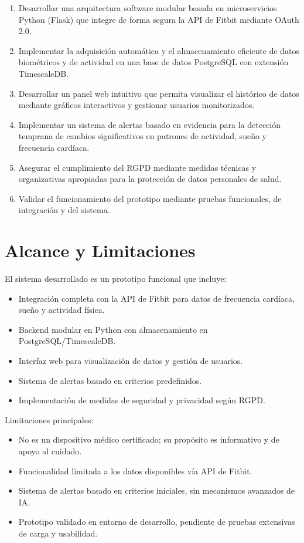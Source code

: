 \begin{enumerate}
    \item Desarrollar una arquitectura software modular basada en microservicios Python (Flask) que integre de forma segura la API de Fitbit\textsuperscript{\textregistered} mediante OAuth 2.0.
    \item Implementar la adquisición automática y el almacenamiento eficiente de datos biométricos y de actividad en una base de datos PostgreSQL con extensión TimescaleDB.
    \item Desarrollar un panel web intuitivo que permita visualizar el histórico de datos mediante gráficos interactivos y gestionar usuarios monitorizados.
    \item Implementar un sistema de alertas basado en evidencia para la detección temprana de cambios significativos en patrones de actividad, sueño y frecuencia cardíaca.
    \item Asegurar el cumplimiento del RGPD mediante medidas técnicas y organizativas apropiadas para la protección de datos personales de salud.
    \item Validar el funcionamiento del prototipo mediante pruebas funcionales, de integración y del sistema.
\end{enumerate}

\section{Alcance y Limitaciones}
\label{sec:intro_alcance}

El sistema desarrollado es un prototipo funcional que incluye:

\begin{itemize}
    \item Integración completa con la API de Fitbit\textsuperscript{\textregistered} para datos de frecuencia cardíaca, sueño y actividad física.
    \item Backend modular en Python con almacenamiento en PostgreSQL/TimescaleDB.
    \item Interfaz web para visualización de datos y gestión de usuarios.
    \item Sistema de alertas basado en criterios predefinidos.
    \item Implementación de medidas de seguridad y privacidad según RGPD.
\end{itemize}

Limitaciones principales:

\begin{itemize}
    \item No es un dispositivo médico certificado; su propósito es informativo y de apoyo al cuidado.
    \item Funcionalidad limitada a los datos disponibles vía API de Fitbit\textsuperscript{\textregistered}.
    \item Sistema de alertas basado en criterios iniciales, sin mecanismos avanzados de IA.
    \item Prototipo validado en entorno de desarrollo, pendiente de pruebas extensivas de carga y usabilidad.
\end{itemize}

